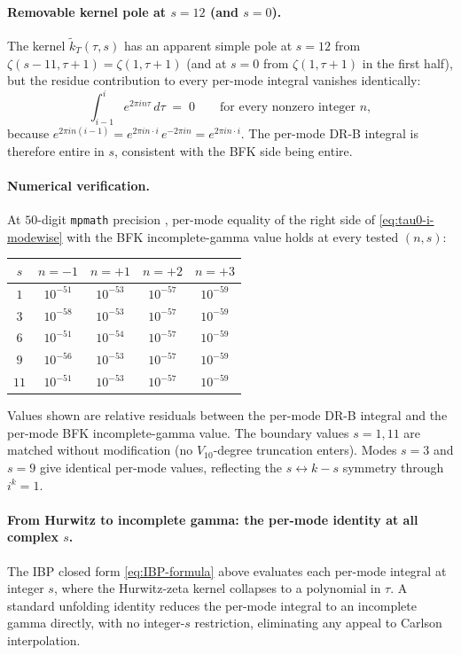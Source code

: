 \documentclass[11pt,letterpaper]{article}
\begin{document}
\paragraph{Removable kernel pole at $s = 12$ (and $s = 0$).}
The kernel $\widetilde{k}_T(\tau, s)$ has an apparent simple pole at $s = 12$ from $\zeta(s-11, \tau+1) = \zeta(1, \tau+1)$ (and at $s = 0$ from $\zeta(1, \tau+1)$ in the first half), but the residue contribution to every per-mode integral vanishes identically:
\[
\int_{i-1}^{i} e^{2\pi i n \tau}\,d\tau \;=\; 0 \qquad \text{for every nonzero integer } n,
\]
because $e^{2\pi i n (i-1)} = e^{2\pi i n \cdot i}\,e^{-2\pi i n} = e^{2\pi i n \cdot i}$.  The per-mode DR-B integral is therefore entire in $s$, consistent with the BFK side being entire.

\paragraph{Numerical verification.}
At $50$-digit \texttt{mpmath} precision \cite{VerifyTau0i, VerifyTau0iMulti}, per-mode equality of the right side of \eqref{eq:tau0-i-modewise} with the BFK incomplete-gamma value holds at every tested $(n, s)$:
\begin{center}
\begin{tabular}{ccccc}
\toprule
$s$ & $n = -1$ & $n = +1$ & $n = +2$ & $n = +3$ \\
\midrule
$1$ & $10^{-51}$ & $10^{-53}$ & $10^{-57}$ & $10^{-59}$ \\
$3$ & $10^{-58}$ & $10^{-53}$ & $10^{-57}$ & $10^{-59}$ \\
$6$ & $10^{-51}$ & $10^{-54}$ & $10^{-57}$ & $10^{-59}$ \\
$9$ & $10^{-56}$ & $10^{-53}$ & $10^{-57}$ & $10^{-59}$ \\
$11$ & $10^{-51}$ & $10^{-53}$ & $10^{-57}$ & $10^{-59}$ \\
\bottomrule
\end{tabular}
\end{center}
Values shown are relative residuals between the per-mode DR-B integral and the per-mode BFK incomplete-gamma value.  The boundary values $s = 1, 11$ are matched without modification (no $V_{10}$-degree truncation enters).  Modes $s = 3$ and $s = 9$ give identical per-mode values, reflecting the $s \leftrightarrow k - s$ symmetry through $i^k = 1$.

\paragraph{From Hurwitz to incomplete gamma: the per-mode identity at all complex $s$.}
The IBP closed form \eqref{eq:IBP-formula} above evaluates each per-mode integral at integer $s$, where the Hurwitz-zeta kernel collapses to a polynomial in $\tau$.  A standard unfolding identity reduces the per-mode integral to an incomplete gamma directly, with no integer-$s$ restriction, eliminating any appeal to Carlson interpolation.
\end{document}
